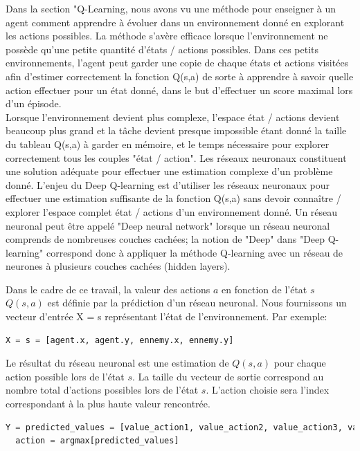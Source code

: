 \documentclass[11pt,a4paper]{report}
\begin{document}
    \par Dans la section "Q-Learning, nous avons vu une méthode pour enseigner à un agent comment apprendre à évoluer dans un environnement donné en explorant les actions possibles. La méthode s'avère efficace lorsque l'environnement ne possède qu'une petite quantité d'états / actions possibles. Dans ces petits environnements, l'agent peut garder une copie de chaque états et actions visitées afin d'estimer correctement la fonction Q(s,a) de sorte à apprendre à savoir quelle action effectuer pour un état donné, dans le but d'effectuer un score maximal lors d'un épisode. \\ 
   Lorsque l'environnement devient plus complexe, l'espace état / actions devient beaucoup plus grand et la tâche devient presque impossible étant donné la taille du tableau Q(s,a) à garder en mémoire, et le temps nécessaire pour explorer correctement tous les couples "état / action". Les réseaux neuronaux constituent une solution  adéquate pour effectuer une estimation complexe d'un problème donné. L'enjeu du Deep Q-learning est d'utiliser les réseaux neuronaux pour effectuer une estimation suffisante de la fonction Q(s,a) sans devoir connaître / explorer l'espace complet état / actions d'un environnement donné. Un réseau neuronal peut être appelé "Deep neural network" lorsque un réseau neuronal comprends de nombreuses couches cachées; la notion de "Deep" dans "Deep Q-learning" correspond donc à appliquer la méthode Q-learning avec un réseau de neurones à plusieurs couches cachées (hidden layers). 
   
   \par Dans le cadre de ce travail, la valeur des actions $a$ en fonction de l'état $s$ $Q(s,a)$ est définie par la prédiction d'un réseau neuronal. Nous fournissons un vecteur d'entrée X = s représentant l'état de l'environnement. Par exemple: 
   
  \begin{lstlisting}[language=python]
  X = s = [agent.x, agent.y, ennemy.x, ennemy.y]
  \end{lstlisting}
   
   \par Le résultat du réseau neuronal est une estimation de $Q(s,a)$ pour chaque action possible lors de l'état $s$. La taille du vecteur de sortie correspond au nombre total d'actions possibles lors de l'état $s$. L'action choisie sera l'index correspondant à la plus haute valeur rencontrée. 

  \begin{lstlisting}[language=python]
  Y = predicted_values = [value_action1, value_action2, value_action3, value_action4]
  action = argmax[predicted_values]
  \end{lstlisting}   
  
\end{document}
